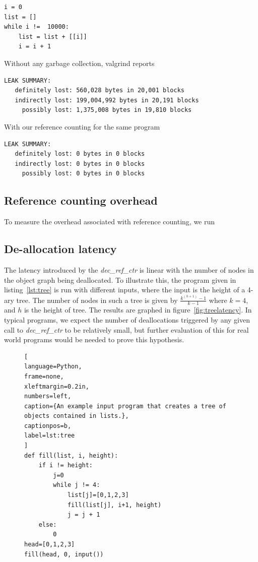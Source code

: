 \documentclass{sigplanconf}
\begin{document}
\begin{verbatim}
i = 0
list = []
while i !=  10000:
    list = list + [[i]]
    i = i + 1
\end{verbatim}

Without any garbage collection, valgrind reports 

\footnotesize
\begin{verbatim}
LEAK SUMMARY:
   definitely lost: 560,028 bytes in 20,001 blocks
   indirectly lost: 199,004,992 bytes in 20,191 blocks
     possibly lost: 1,375,008 bytes in 19,810 blocks
\end{verbatim}
\normalsize

With our reference counting for the same program

\footnotesize
\begin{verbatim}
LEAK SUMMARY:
   definitely lost: 0 bytes in 0 blocks
   indirectly lost: 0 bytes in 0 blocks
     possibly lost: 0 bytes in 0 blocks
\end{verbatim}
\normalsize


\subsection{Reference counting overhead}

To measure the overhead associated with reference counting, we run 

\subsection{De-allocation latency}

The latency introduced by the \textit{dec\_ref\_ctr} is linear with the number of nodes in the object graph being deallocated.  To illustrate this, the program given in listing~\ref{lst:tree} is run with different inputs, where the input is the height of a 4-ary tree.  The number of nodes in such a tree is given by $\frac{{k}^{\left(h+1\right)}-1}{k-1}$ where $k=4$, and $h$ is the height of tree.  The results are graphed in figure~\ref{fig:treelatency}.  In typical programs, we expect the number of deallocations triggered by any given call to \textit{dec\_ref\_ctr} to be relatively small, but further evaluation of this for real world programs would be needed to prove this hypothesis.

\begin{figure}[h!]
\begin{lstlisting}[
language=Python,
frame=none,
xleftmargin=0.2in,
numbers=left,
caption={An example input program that creates a tree of objects contained in lists.},
captionpos=b,
label=lst:tree
]
def fill(list, i, height):
    if i != height:
        j=0
        while j != 4:
            list[j]=[0,1,2,3]
            fill(list[j], i+1, height)
            j = j + 1
    else:
        0
head=[0,1,2,3]
fill(head, 0, input())
\end{lstlisting}
\end{figure}
\end{document}
